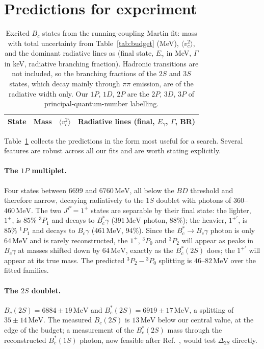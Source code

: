 \documentclass[10pt,twocolumn]{article}
\newcommand{\Bc}{B_c}
\newcommand{\Bcs}{B_c^*}
\newcommand{\MeV}{\,\mathrm{MeV}}
\begin{document}
\section{Predictions for experiment}
\label{sec:predictions}

\begin{table}[t]
\caption{Excited $\Bc$ states from the running-coupling Martin fit: mass with total uncertainty from Table~\ref{tab:budget} (MeV), $\langle v_c^2\rangle$, and the dominant radiative lines as (final state, $E_\gamma$ in MeV, $\Gamma$ in keV, radiative branching fraction). Hadronic transitions are not included, so the branching fractions of the $2S$ and $3S$ states, which decay mainly through $\pi\pi$ emission, are of the radiative width only. Our $1P$, $1D$, $2P$ are the $2P$, $3D$, $3P$ of principal-quantum-number labelling.}
\label{tab:pred}
\centering\small
\begin{tabular}{llcl}
\toprule
State & Mass & $\langle v_c^2\rangle$ & Radiative lines (final, $E_\gamma$, $\Gamma$, BR) \\
\midrule

\end{tabular}
\end{table}

Table~\ref{tab:pred} collects the predictions in the form most useful for a search.
Several features are robust across all our fits and are worth stating explicitly.

\paragraph{The $1P$ multiplet.}
Four states between $6699$ and $6760\MeV$, all below the $BD$ threshold and therefore narrow, decaying radiatively to the $1S$ doublet with photons of $360$--$460\MeV$.
The two $J^P=1^+$ states are separable by their final state: the lighter, $1^+$, is $85\%$ $^3P_1$ and decays to $\Bcs\gamma$ ($391\MeV$ photon, $88\%$); the heavier, $1^{+\prime}$, is $85\%$ $^1P_1$ and decays to $\Bc\gamma$ ($461\MeV$, $94\%$).
Since the $\Bcs\to\Bc\gamma$ photon is only $64\MeV$ and is rarely reconstructed, the $1^+$, $^3P_0$ and $^3P_2$ will appear as peaks in $\Bc\gamma$ at masses shifted down by $64\MeV$, exactly as the $\Bcs(2S)$ does; the $1^{+\prime}$ will appear at its true mass.
The predicted ${}^3P_2-{}^3P_0$ splitting is $46$--$82\MeV$ over the fitted families.

\paragraph{The $2S$ doublet.}
$\Bc(2S)=6884\pm19\MeV$ and $\Bcs(2S)=6919\pm17\MeV$, a splitting of $35\pm14\MeV$.
The measured $\Bc(2S)$ is $13\MeV$ below our central value, at the edge of the budget; a measurement of the $\Bcs(2S)$ mass through the reconstructed $\Bcs(1S)$ photon, now feasible after Ref.~\cite{ATLAS2026}, would test $\Delta_{2S}$ directly.
\end{document}
